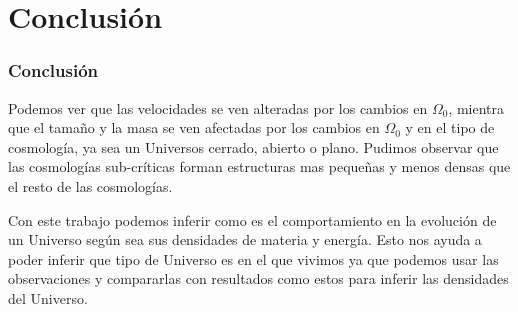 \documentclass{beamer}
\begin{document}
\section{Conclusión}
	\begin{frame}
		\frametitle{Conclusión}
Podemos ver que las velocidades se ven alteradas por los cambios en $\Omega_0$, mientra que el tamaño y la masa se ven afectadas por los cambios en $\Omega_0$ y en el tipo de cosmología, ya sea un Universos cerrado, abierto o plano. Pudimos observar que las cosmologías sub-críticas forman estructuras mas pequeñas y menos densas que el resto de las cosmologías.

Con este trabajo podemos inferir como es el comportamiento en la evolución de un Universo según sea sus densidades de materia y energía. Esto nos ayuda a poder inferir que tipo de Universo es en el que vivimos ya que podemos usar las observaciones y compararlas con resultados como estos para inferir las densidades del Universo.

	\end{frame}
\end{document}
